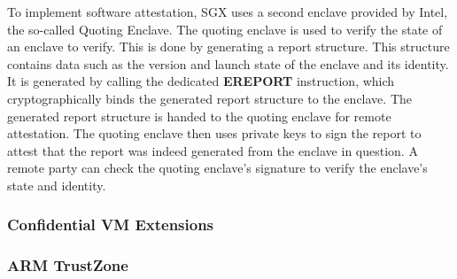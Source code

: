To implement software attestation, SGX uses a second enclave provided by Intel, the so-called Quoting Enclave. The
quoting enclave is used to verify the state of an enclave to verify. This is done by generating a report structure. This
structure contains data such as the version and launch state of the enclave and its identity. It is generated by calling
the dedicated \textbf{EREPORT} instruction, which cryptographically binds the generated report structure to the enclave.
The generated report structure is handed to the quoting enclave for remote attestation. The quoting enclave then uses
private keys to sign the report to attest that the report was indeed generated from the enclave in question. A remote
party can check the quoting enclave's signature to verify the enclave's state and identity.

\subsubsection{Confidential VM Extensions}
\subsubsection{ARM TrustZone}
